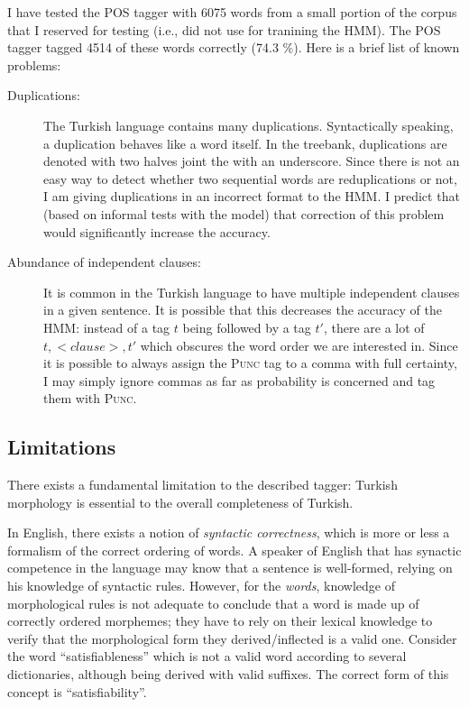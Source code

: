 \documentclass{article}
\begin{document}
I have tested the POS tagger with 6075 words from a small portion of the corpus
that I reserved for testing (i.e., did not use for tranining the HMM). The POS
tagger tagged 4514 of these words correctly (74.3 \%). Here is a brief list of
known problems:

\begin{description}

  \item[Duplications:] The Turkish language contains many duplications.
  Syntactically speaking, a duplication behaves like a word itself. In the
  treebank, duplications are denoted with two halves joint the with an
  underscore. Since there is not an easy way to detect whether two sequential
  words are reduplications or not, I am giving duplications in an incorrect
  format to the HMM.  I predict that (based on informal tests with the model)
  that correction of this problem would significantly increase the accuracy.

  \item[Abundance of independent clauses:] It is common in the Turkish language
  to have multiple independent clauses in a given sentence. It is possible that
  this decreases the accuracy of the HMM: instead of a tag $t$ being followed by
  a tag $t'$, there are a lot of $t, <clause>, t'$ which obscures the word order
  we are interested in. Since it is possible to always assign the \textsc{Punc}
  tag to a comma with full certainty, I may simply ignore commas as far as
  probability is concerned and tag them with \textsc{Punc}.

\end{description}

\subsection{Limitations}
There exists a fundamental limitation to the described tagger: Turkish
morphology is essential to the overall completeness of Turkish.

In English, there exists a notion of \emph{syntactic correctness}, which is more
or less a formalism of the correct ordering of words. A speaker of English that
has synactic competence in the language \citep{bachman1990} may know that a
sentence is well-formed, relying on his knowledge of syntactic rules. However,
for the \textit{words}, knowledge of morphological rules is not adequate to
conclude that a word is made up of correctly ordered morphemes; they have to
rely on their lexical knowledge to verify that the morphological form they
derived/inflected is a valid one. Consider the word ``satisfiableness'' which is
not a valid word according to several dictionaries, although being derived with
valid suffixes. The correct form of this concept is ``satisfiability''.
\end{document}
